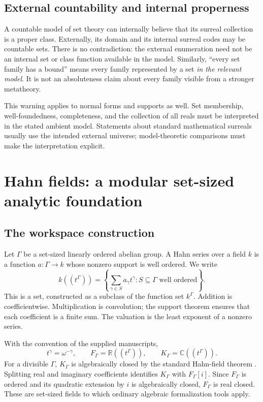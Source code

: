 \documentclass[11pt,letterpaper]{article}
\numberwithin{equation}{section}
\theoremstyle{definition}
\theoremstyle{remark}
\newcommand{\R}{\mathbb{R}}
\newcommand{\C}{\mathbb{C}}
\begin{document}
\subsection{External countability and internal properness}
A countable model of set theory can internally believe that its surreal collection is a proper class. Externally, its domain and its internal surreal codes may be countable sets. There is no contradiction: the external enumeration need not be an internal set or class function available in the model. Similarly, ``every set family has a bound'' means every family represented by a set \emph{in the relevant model}. It is not an absoluteness claim about every family visible from a stronger metatheory.

This warning applies to normal forms and supports as well. Set membership, well-foundedness, completeness, and the collection of all reals must be interpreted in the stated ambient model. Statements about standard mathematical surreals usually use the intended external universe; model-theoretic comparisons must make the interpretation explicit.

\section{Hahn fields: a modular set-sized analytic foundation}\label{sec:hahn}
\subsection{The workspace construction}
Let $\Gamma$ be a set-sized linearly ordered abelian group. A Hahn series over a field $k$ is a function $a:\Gamma\to k$ whose nonzero support is well ordered. We write
\[
 k((t^\Gamma))=\left\{\sum_{\gamma\in S}a_\gamma t^\gamma:
                S\subseteq\Gamma\text{ well ordered}\right\}.
\]
This is a set, constructed as a subclass of the function set $k^\Gamma$. Addition is coefficientwise. Multiplication is convolution; the support theorem ensures that each coefficient is a finite sum. The valuation is the least exponent of a nonzero series.

With the convention of the supplied manuscripts,
\[
 t^\gamma=\omega^{-\gamma},\qquad
 F_\Gamma=\R((t^\Gamma)),\qquad K_\Gamma=\C((t^\Gamma)).
\]
For a divisible $\Gamma$, $K_\Gamma$ is algebraically closed by the standard Hahn-field theorem \cite[Corollary 4]{Poonen}. Splitting real and imaginary coefficients identifies $K_\Gamma$ with $F_\Gamma[i]$. Since $F_\Gamma$ is ordered and its quadratic extension by $i$ is algebraically closed, $F_\Gamma$ is real closed. These are set-sized fields to which ordinary algebraic formalization tools apply.
\end{document}
